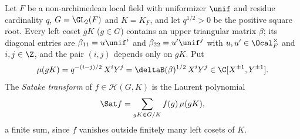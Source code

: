 Let $F$ be a non-archimedean local field with uniformizer $\unif$ and residue cardinality $q$, $G=\GL_2(F)$ and
$K=K_F$, and let $q^{1/2}>0$ be the positive square root. Every left coset $gK$ ($g\in G$) contains an upper triangular
matrix $\beta$; its diagonal entries are $\beta_{11}=u\unif^i$ and $\beta_{22}=u'\unif^j$ with $u,u'\in\Ocal_F^\times$ and
$i,j\in\Z$, and the pair $(i,j)$ depends only on $gK$. Put
\[
  \mu(gK)=q^{-(i-j)/2}\,X^iY^j=\deltaB(\beta)^{1/2}\,X^iY^j\in\C[X^{\pm1},Y^{\pm1}].
\]
The \emph{Satake transform} of $f\in\mathcal H(G,K)$ is the Laurent polynomial
\[
  \Sat f=\sum_{gK\in G/K}f(g)\,\mu(gK),
\]
a finite sum, since $f$ vanishes outside finitely many left cosets of $K$.
